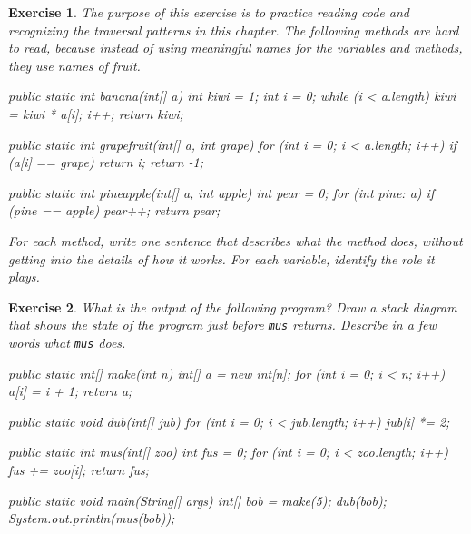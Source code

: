 \documentclass[12pt]{book}
\theoremstyle{exercise}
\newtheorem{exercise}{Exercise}[chapter]
\newcommand{\java}[1]{\verb"#1"}
\begin{document}
\begin{exercise}
The purpose of this exercise is to practice reading code and recognizing the traversal patterns in this chapter.
The following methods are hard to read, because instead of using meaningful names for the variables and methods, they use names of fruit.

\begin{code}
    public static int banana(int[] a) {
        int kiwi = 1;
        int i = 0;
        while (i < a.length) {
            kiwi = kiwi * a[i];
            i++;
        }
        return kiwi;
    }
\end{code}

\begin{code}
    public static int grapefruit(int[] a, int grape) {
        for (int i = 0; i < a.length; i++) {
            if (a[i] == grape) {
                return i;
            }
        }
        return -1;
    }
\end{code}

\begin{code}
    public static int pineapple(int[] a, int apple) {
        int pear = 0;
        for (int pine: a) {
            if (pine == apple) {
                pear++;
            }
        }
        return pear;
    }
\end{code}

For each method, write one sentence that describes what the method does, without getting into the details of how it works.
For each variable, identify the role it plays.

\end{exercise}


\begin{exercise}
What is the output of the following program?
Draw a stack diagram that shows the state of the program just before \java{mus} returns.
Describe in a few words what \java{mus} does.

\begin{code}
    public static int[] make(int n) {
        int[] a = new int[n];
        for (int i = 0; i < n; i++) {
            a[i] = i + 1;
        }
        return a;
    }
\end{code}

\begin{code}
    public static void dub(int[] jub) {
        for (int i = 0; i < jub.length; i++) {
            jub[i] *= 2;
        }
    }
\end{code}

\begin{code}
    public static int mus(int[] zoo) {
        int fus = 0;
        for (int i = 0; i < zoo.length; i++) {
            fus += zoo[i];
        }
        return fus;
    }
\end{code}

\begin{code}
    public static void main(String[] args) {
        int[] bob = make(5);
        dub(bob);
        System.out.println(mus(bob));
    }
\end{code}
\end{exercise}
\end{document}
